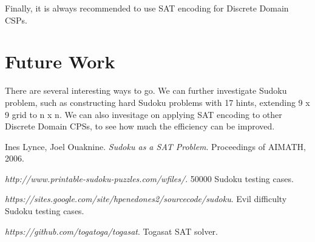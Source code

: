 \documentclass[11pt]{article}
\begin{document}
Finally, it is always recommended to use SAT encoding for Discrete Domain CSPs.

\section {Future Work}
There are several interesting ways to go. We can further investigate Sudoku problem, such as constructing hard Sudoku problems with 17 hints, extending 9 x 9 grid to n x n. We can also invesitage on applying SAT encoding to other Discrete Domain CPSs, to see how much the efficiency can be improved.

\begin{thebibliography}{9}

Ines Lynce, Joel Ouaknine.
\textit{Sudoku as a SAT Problem}.
Proceedings of AIMATH, 2006.

\textit{http://www.printable-sudoku-puzzles.com/wfiles/}.
50000 Sudoku testing cases.

\textit{https://sites.google.com/site/hpenedones2/sourcecode/sudoku}.
Evil difficulty Sudoku testing cases.

\textit{https://github.com/togatoga/togasat}.
Togasat SAT solver.
 
\end{thebibliography}
\end{document}
